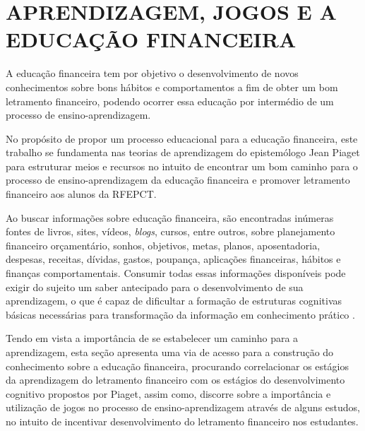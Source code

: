 \section{APRENDIZAGEM, JOGOS E A EDUCAÇÃO FINANCEIRA}
A educação financeira tem por objetivo o desenvolvimento de novos conhecimentos sobre bons hábitos e comportamentos a fim de obter um bom letramento financeiro, podendo ocorrer essa educação por intermédio de um processo de ensino-aprendizagem.

No propósito de propor um processo educacional para a educação financeira, este trabalho se fundamenta nas teorias de aprendizagem do epistemólogo Jean Piaget para estruturar meios e recursos no intuito de encontrar um bom caminho para o processo de ensino-aprendizagem da educação financeira e promover letramento financeiro aos alunos da RFEPCT.

Ao buscar informações sobre educação financeira, são encontradas inúmeras fontes de livros, sites, vídeos, \textit{blogs}, cursos, entre outros, sobre planejamento financeiro orçamentário, sonhos, objetivos, metas, planos, aposentadoria, despesas, receitas, dívidas, gastos, poupança, aplicações financeiras, hábitos e finanças comportamentais. Consumir todas essas informações disponíveis pode exigir do sujeito um saber antecipado para o desenvolvimento de sua aprendizagem, o que é capaz de dificultar a formação de estruturas cognitivas básicas necessárias para transformação da informação em conhecimento prático \cite{piaget2011}. 

Tendo em vista a importância de se estabelecer um caminho para a aprendizagem, esta seção apresenta uma via de acesso para a construção do conhecimento sobre a educação financeira, procurando correlacionar os estágios da aprendizagem do letramento financeiro com os estágios do desenvolvimento cognitivo propostos por Piaget, assim como, discorre sobre a importância e utilização de jogos no processo de ensino-aprendizagem através de alguns estudos, no intuito de incentivar desenvolvimento do letramento financeiro nos estudantes.

